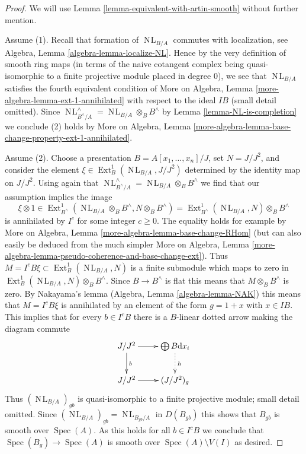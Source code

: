 \documentclass{stacks-project}
\theoremstyle{plain}
\theoremstyle{definition}
\theoremstyle{remark}
\numberwithin{equation}{subsection}
\def\Spec{\mathop{\mathrm{Spec}}}
\def\Ext{\mathop{\mathrm{Ext}}\nolimits}
\def\NL{\mathop{N\!L}\nolimits}
\begin{document}
\begin{proof}
We will use Lemma \ref{lemma-equivalent-with-artin-smooth}
without further mention.

\medskip\noindent
Assume (1). Recall that formation of $\NL_{B/A}$ commutes with
localization, see Algebra, Lemma \ref{algebra-lemma-localize-NL}.
Hence by the very definition of smooth ring maps (in terms of
the naive cotangent complex being quasi-isomorphic to a finite
projective module placed in degree $0$), we see that
$\NL_{B/A}$ satisfies the fourth equivalent condition
of More on Algebra, Lemma \ref{more-algebra-lemma-ext-1-annihilated}
with respect to the ideal $IB$ (small detail omitted).
Since $\NL_{B^\wedge/A}^\wedge = \NL_{B/A} \otimes_B B^\wedge$
by Lemma \ref{lemma-NL-is-completion} we conclude (2) holds by
More on Algebra, Lemma
\ref{more-algebra-lemma-base-change-property-ext-1-annihilated}.

\medskip\noindent
Assume (2). Choose a presentation
$B = A[x_1, \ldots, x_n]/J$, set $N = J/J^2$, and
consider the element $\xi \in \Ext^1_B(\NL_{B/A}, J/J^2)$
determined by the identity map on $J/J^2$.
Using again that $\NL_{B^\wedge/A}^\wedge = \NL_{B/A} \otimes_B B^\wedge$
we find that our assumption implies the image
$$
\xi \otimes 1 \in
\Ext^1_{B^\wedge}(\NL_{B/A} \otimes_B B^\wedge, N \otimes_B B^\wedge) =
\Ext^1_{B^\wedge}(\NL_{B/A}, N) \otimes_B B^\wedge
$$
is annihilated by $I^c$ for some integer $c \geq 0$.
The equality holds for example by
More on Algebra, Lemma \ref{more-algebra-lemma-base-change-RHom}
(but can also easily be deduced from the much simpler
More on Algebra, Lemma
\ref{more-algebra-lemma-pseudo-coherence-and-base-change-ext}).
Thus $M = I^cB\xi \subset \Ext^1_B(\NL_{B/A}, N)$ is a finite submodule
which maps to zero in $\Ext^1_B(\NL_{B/A}, N) \otimes_B B^\wedge$.
Since $B \to B^\wedge$ is flat this means that
$M \otimes_B B^\wedge$ is zero. By 
Nakayama's lemma (Algebra, Lemma \ref{algebra-lemma-NAK})
this means that $M = I^cB\xi$ is annihilated by an element
of the form $g = 1 + x$ with $x \in IB$.
This implies that for every $b \in I^cB$ there is a
$B$-linear dotted arrow making the diagram commute
$$
\xymatrix{
J/J^2 \ar[r] \ar[d]^b & \bigoplus B\text{d}x_i \ar@{..>}[d]^h \\
J/J^2 \ar[r] & (J/J^2)_g
}
$$
Thus $(\NL_{B/A})_{gb}$ is quasi-isomorphic
to a finite projective module; small detail omitted.
Since $(\NL_{B/A})_{gb} = \NL_{B_{gb}/A}$ in $D(B_{gb})$
this shows that $B_{gb}$ is smooth over $\Spec(A)$.
As this holds for all $b \in I^cB$ we conclude
that $\Spec(B_g) \to \Spec(A)$ is smooth over $\Spec(A) \setminus V(I)$
as desired.
\end{proof}
\end{document}
